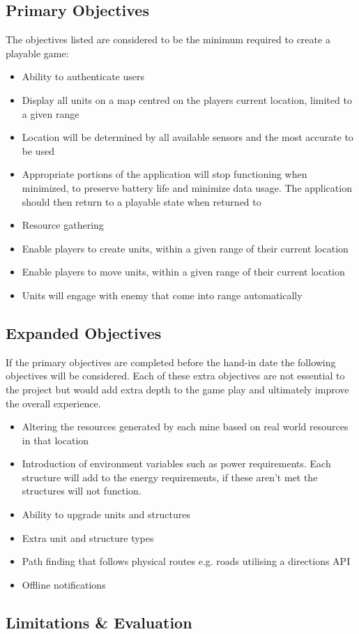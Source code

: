\subsection{Primary Objectives}
The objectives listed are considered to be the minimum required to create a playable game:
\begin{itemize}
\item Ability to authenticate users
\item Display all units on a map centred on the players current location, limited to a given range
\item Location will be determined by all available sensors and the most accurate to be used
\item Appropriate portions of the application will stop functioning when minimized, to preserve battery life and minimize data usage. The application should then return to a playable state when returned to
\item Resource gathering
\item Enable players to create units, within a given range of their current location
\item Enable players to move units, within a given range of their current location
\item Units will engage with enemy that come into range automatically
\end{itemize} 

\subsection{Expanded Objectives}
If the primary objectives are completed before the hand-in date the following objectives will be considered. Each of these extra objectives are not essential to the project but would add extra depth to the game play and ultimately improve the overall experience.
\begin{itemize}
\item Altering the resources generated by each mine based on real world resources in that location
\item Introduction of environment variables such as power requirements. Each structure will add to the energy requirements, if these aren't met the structures will not function.
\item Ability to upgrade units and structures
\item Extra unit and structure types
\item Path finding that follows physical routes e.g. roads utilising a directions API
\item Offline notifications
\end{itemize}


\subsection{Limitations \& Evaluation}

